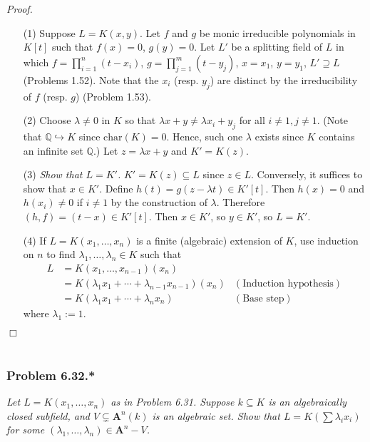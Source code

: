 \documentclass{article}
\begin{document}
\emph{Proof.}
\begin{enumerate}
\item[(1)]
  Suppose $L = K(x,y)$.
  Let $f$ and $g$ be monic irreducible polynomials in $K[t]$ such that $f(x) = 0$, $g(y) = 0$.
  Let $L'$ be a splitting field of $L$ in which
  $f = \prod_{i=1}^{n} (t - x_i)$,
  $g = \prod_{j=1}^{m} (t - y_j)$,
  $x = x_1$, $y = y_1$, $L' \supseteq L$ (Problems 1.52).
  Note that the $x_i$ (resp. $y_j$) are distinct by the irreducibility of $f$ (resp. $g$)
  (Problem 1.53).

\item[(2)]
  Choose $\lambda \neq 0$ in $K$ so that
  $\lambda x + y \neq \lambda x_i + y_j$ for all $i \neq 1, j \neq 1$.
  (Note that $\mathbb{Q} \hookrightarrow K$ since $\mathrm{char}(K) = 0$.
  Hence, such one $\lambda$ exists since $K$ contains an infinite set $\mathbb{Q}$.)
  Let $z = \lambda x + y$ and $K' = K(z)$.

\item[(3)]
  \emph{Show that $L = K'$.}
  $K' = K(z) \subseteq L$ since $z \in L$.
  Conversely, it suffices to show that $x \in K'$.
  Define $h(t) = g(z - \lambda t) \in K'[t]$.
  Then $h(x) = 0$ and $h(x_i) \neq 0$ if $i \neq 1$ by the construction of $\lambda$.
  Therefore $(h,f) = (t-x) \in K'[t]$.
  Then $x \in K'$, so $y \in K'$, so $L = K'$.

\item[(4)]
  If $L = K(x_1,\ldots,x_n)$ is a finite (algebraic) extension of $K$,
  use induction on $n$ to find $\lambda_1,\ldots,\lambda_n \in K$ such that
  \begin{align*}
    L
    &= K(x_1,\ldots,x_{n-1})(x_n) \\
    &= K(\lambda_1 x_1 + \cdots + \lambda_{n-1} x_{n-1})(x_n)
      &(\text{Induction hypothesis}) \\
    &= K(\lambda_1 x_1 + \cdots + \lambda_n x_n)
      &(\text{Base step})
  \end{align*}
  where $\lambda_1 := 1$.
\end{enumerate}
$\Box$ \\\\






\subsubsection*{Problem 6.32.*}
\emph{Let $L = K(x_1,\ldots,x_n)$ as in Problem 6.31.
Suppose $k \subseteq K$ is an algebraically closed subfield,
and $V \subsetneq \mathbf{A}^{n}(k)$ is an algebraic set.
Show that $L = K(\sum \lambda_i x_i)$ for some
$(\lambda_1,\ldots,\lambda_n) \in \mathbf{A}^{n} - V$.} \\
\end{document}
